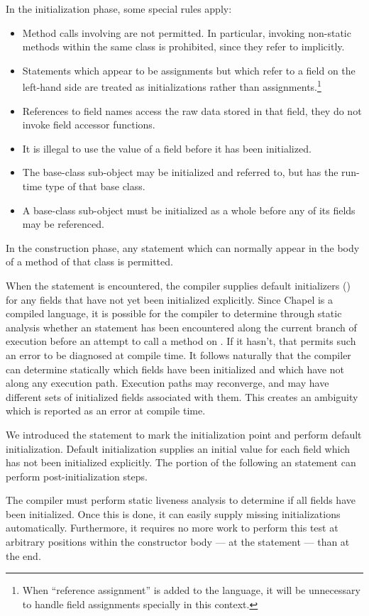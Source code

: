 In the initialization phase, some special rules apply:
\begin{itemize}
\item Method calls involving  are
not permitted.  In particular, invoking non-static methods within the same class
is prohibited, since they refer to  implicitly.
\item Statements which appear to be assignments but which refer to a field on
the left-hand side are treated as initializations rather than
assignments.\footnote{When ``reference assignment'' is added to the language, it
will be unnecessary to handle field assignments specially in this context.}
\item References to field names access the raw data stored in that field, they
do not invoke field accessor functions.
\item It is illegal to use the value of a field before it has been initialized.
\item The base-class sub-object may be initialized and referred to, but has the
run-time type of that base class.
\item A base-class sub-object must be initialized as a whole before any of its
fields may be referenced.
\end{itemize}
\noindent
In the construction phase, any statement which can normally appear in the body
of a method of that class is permitted.

When the  statement is encountered, the compiler supplies default
initializers () for any fields that have not yet
been initialized explicitly.  Since Chapel is a compiled language, it is
possible for the compiler to determine through static analysis whether
an  statement has been encountered along the current branch of
execution before an attempt to call a method on .  If it hasn't, that permits such
an error to be diagnosed at compile time.  It follows naturally that the
compiler can determine statically which fields have been initialized and which
have not along any execution path.  Execution paths may reconverge, and may have
different sets of initialized fields associated with them.  This creates an
ambiguity which is reported as an error at compile time.

\begin{rationale}
We introduced the  statement to mark the initialization point and
perform default initialization.  Default initialization supplies an initial
value for each field which has not been initialized explicitly.  The portion of
the  following an  statement can perform
post-initialization steps. 

The compiler must perform static liveness analysis to determine if all
fields have been initialized.  Once this is done, it can easily supply missing
initializations automatically.  Furthermore, it requires no more work to perform
this test at arbitrary positions within the constructor body --- at
the  statement --- than at the end.
\end{rationale}

